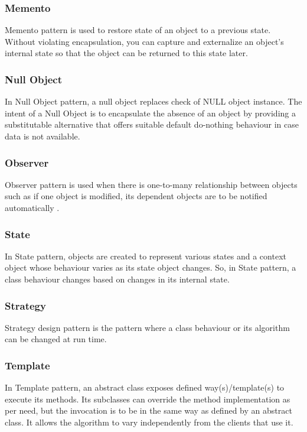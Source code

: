 \documentclass[sigplan,12pt,nonacm=true,review=false]{acmart}
\begin{document}
\subsubsection{Memento}
Memento pattern is used to restore state of an object to a previous state. Without violating encapsulation, you can capture and externalize an object's internal state so that the object can be returned to this state later. 

\subsubsection{Null Object}
In Null Object pattern, a null object replaces check of NULL object instance. The intent of a Null Object is to encapsulate the absence of an object by providing a substitutable alternative that offers suitable default do-nothing behaviour in case data is not available.

\subsubsection{Observer}
Observer pattern is used when there is one-to-many relationship between objects such as if one object is modified, its dependent objects are to be notified automatically \cite{wendorff_assessment_2001}. 

\subsubsection{State}
In State pattern, objects are created to represent various states and a context object whose behaviour varies as its state object changes. So, in State pattern, a class behaviour changes based on changes in its internal state. 

\subsubsection{Strategy}
Strategy design pattern is the pattern where a class behaviour or its algorithm can be changed at run time. 

\subsubsection{Template}
In Template pattern, an abstract class exposes defined way(s)/template(s) to execute its methods. Its subclasses can override the method implementation as per need, but the invocation is to be in the same way as defined by an abstract class. It allows the algorithm to vary independently from the clients that use it. 
\end{document}
